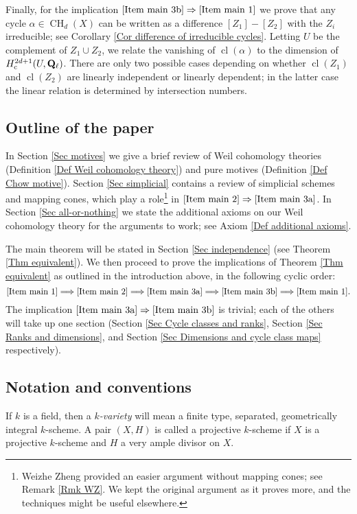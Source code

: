 \documentclass[11pt]{amsart}
\theoremstyle{definition}
\newcommand{\Q}{\mathbf Q}
\newcommand{\cs}{_{\text{\normalfont c}}}
\newcommand{\CH}{\operatorname{CH}}
\newcommand{\cl}{\operatorname{cl}}
\newcommand{\Ra}{\Rightarrow}
\newcommand{\RA}{\Longrightarrow}
\begin{document}
Finally, for the implication $\ref{Item main 3b} \Ra \ref{Item main
1}$ we prove that any cycle $\alpha \in \CH_d(X)$ can be written as
a difference $[Z_1] - [Z_2]$ with the $Z_i$ irreducible; see
Corollary \ref{Cor difference of irreducible cycles}. Letting $U$ be
the complement of $Z_1 \cup Z_2$, we relate the vanishing of
$\cl(\alpha)$ to the dimension of $H^{2d+1}\cs(U,\Q_\ell)$. There
are only two possible cases depending on whether $\cl(Z_1)$ and
$\cl(Z_2)$ are linearly independent or linearly dependent; in the
latter case the linear relation is determined by intersection
numbers.

\subsection*{Outline of the paper}
In Section \ref{Sec motives} we give a brief review of Weil
cohomology theories (Definition \ref{Def Weil cohomology theory})
and pure motives (Definition \ref{Def Chow motive}). Section
\ref{Sec simplicial} contains a review of simplicial schemes and
mapping cones, which play a role\footnote{Weizhe Zheng provided an
easier argument without mapping cones; see Remark \ref{Rmk WZ}. We
kept the original argument as it proves more, and the techniques
might be useful elsewhere.} in $\ref{Item main 2} \Ra \ref{Item main
3a}$. In Section \ref{Sec all-or-nothing} we state the additional
axioms on our Weil cohomology theory for the arguments to work; see
Axiom \ref{Def additional axioms}.

The main theorem will be stated in Section \ref{Sec independence}
(see Theorem \ref{Thm equivalent}). We then proceed to prove the
implications of Theorem \ref{Thm equivalent} as outlined in the
introduction above, in the following cyclic order:
\[
\ref{Item main 1} \RA \ref{Item main 2} \RA \ref{Item main 3a} \RA
\ref{Item main 3b} \RA \ref{Item main 1}.
\]
The implication $\ref{Item main 3a} \Ra \ref{Item main 3b}$ is
trivial; each of the others will take up one section (Section
\ref{Sec Cycle classes and ranks}, Section \ref{Sec Ranks and
dimensions}, and Section \ref{Sec Dimensions and cycle class maps}
respectively).

{}
\subsection*{Notation and conventions}\label{Sec Notation}
If $k$ is a field, then a \emph{$k$-variety} will mean a finite
type, separated, geometrically integral $k$-scheme. A pair $(X,H)$
is called a projective $k$-scheme if $X$ is a projective $k$-scheme
and $H$ a very ample divisor on $X$.
\end{document}
